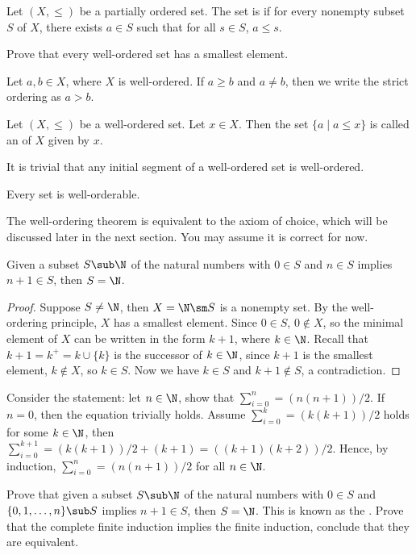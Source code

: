 \documentclass[10pt]{article}
\begin{document}
\begin{definition}
    Let $(X,\le)$ be a partially ordered set. The set is  if for every nonempty subset $S$ of $X$, there exists $a\in S$ such that for all $s\in S$, $a\le s$.
\end{definition}
\begin{problem}
    Prove that every well-ordered set has a smallest element.
\end{problem}
\par
Let $a,b\in X$, where $X$ is well-ordered. If $a\ge b$ and $a\ne b$, then we write the strict ordering as $a>b$.
\begin{definition}
    Let $(X,\le)$ be a well-ordered set. Let $x\in X$. Then the set $\{a\mid a\le x\}$ is called an  of $X$ given by $x$.
\end{definition}
\par
It is trivial that any initial segment of a well-ordered set is well-ordered.
\begin{theorem}
    Every set is well-orderable.
\end{theorem}
\par
The well-ordering theorem is equivalent to the axiom of choice, which will be discussed later in the next section. You may assume it is correct for now. 
\begin{theorem}
    Given a subset $S\sub\N$ of the natural numbers with $0\in S$ and $n\in S$ implies $n+1\in S$, then $S=\N$.
\end{theorem}
\begin{proof}
    Suppose $S\ne\N$, then $X=\N\sm S$ is a nonempty set. By the well-ordering principle, $X$ has a smallest element. Since $0\in S$, $0\notin X$, so the minimal element of $X$ can be written in the form $k+1$, where $k\in\N$. Recall that $k+1={k}^{+}=k\cup\{k\}$ is the successor of $k\in\N$, since $k+1$ is the smallest element, $k\notin X$, so $k\in S$. Now we have $k\in S$ and $k+1\notin S$, a contradiction.
\end{proof}
\begin{example}
    Consider the statement: let $n\in\N$, show that ${\sum}_{i=0}^{n}=(n(n+1))/2$. If $n=0$, then the equation trivially holds. Assume ${\sum}_{i=0}^{k}=(k(k+1))/2$ holds for some $k\in\N$, then ${\sum}_{i=0}^{k+1}=(k(k+1))/2+(k+1)=((k+1)(k+2))/2$. Hence, by induction, ${\sum}_{i=0}^{n}=(n(n+1))/2$ for all $n\in\N$.
\end{example}
\begin{problem}
    Prove that given a subset $S\sub\N$ of the natural numbers with $0\in S$ and $\{0,1,\dots,n\}\sub S$ implies $n+1\in S$, then $S=\N$. This is known as the . Prove that the complete finite induction implies the finite induction, conclude that they are equivalent.
\end{problem}
\end{document}
